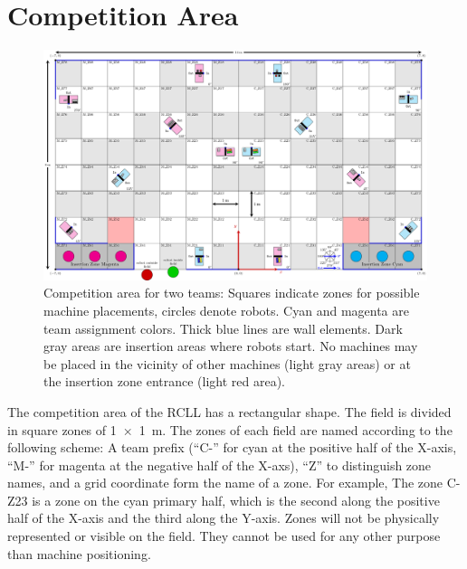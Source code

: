\documentclass[12pt,twoside]{article}
\begin{document}
\section{Competition Area} \label{sec:area}
\begin{figure}[p]
    \includegraphics[width=\paperwidth, angle=-90, trim=0 0 0 0,]{field2022.pdf}
    \vspace{1ex}
    \caption{%
      Competition area for two teams: Squares indicate zones for possible
      machine placements, circles denote robots. Cyan and magenta are
      team assignment colors. Thick blue lines are wall elements.
      Dark gray areas are insertion areas where robots start. No machines may
      be placed in the vicinity of other machines (light gray areas) or at
      the insertion zone entrance (light red area).
    }
    \label{fig:competition-area}
\end{figure}
The competition area of the \ac{RCLL} has a rectangular shape. The field is
divided in square zones of \SI{1 x 1}{\metre}. %
The zones of each field are named according to the following scheme:
A team prefix (``C-'' for cyan at the positive half of the X-axis, ``M-'' for
magenta at the negative half of the X-axs), ``Z'' to distinguish zone names,
and a grid coordinate form the name of a zone.
For example, The zone C-Z23 is a zone on the cyan primary half, which is
the second along the positive half of the X-axis and the third along the Y-axis.
Zones will not be physically represented or visible on the field.
They cannot be used for any other purpose than machine positioning.
\end{document}
